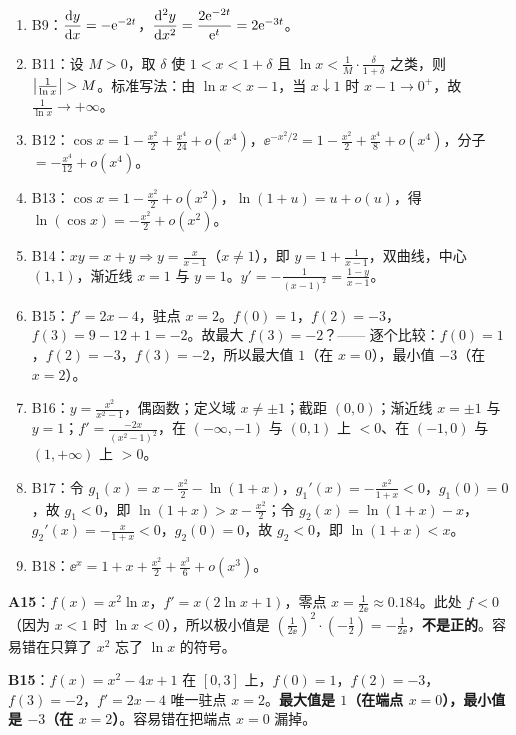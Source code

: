 \begin{methodbox}[B 卷关键步骤]
\begin{enumerate}
\item B9：$\dfrac{\mathrm{d} y}{\mathrm{d} x}=-\mathrm{e}^{-2t}$，$\dfrac{\mathrm{d}^{2}y}{\mathrm{d} x^{2}}=\dfrac{2\mathrm{e}^{-2t}}{\mathrm{e}^{t}}=2\mathrm{e}^{-3t}$。
\item B11：设 $M>0$，取 $\delta$ 使 $1<x<1+\delta$ 且 $\ln x<\frac{1}{M}\cdot\frac{\delta}{1+\delta}$ 之类，则 $\left\lvert \frac1{\ln x}\right\rvert>M$。标准写法：由 $\ln x< x-1$，当 $x\downarrow1$ 时 $x-1\to0^{+}$，故 $\frac{1}{\ln x}\to+\infty$。
\item B12：$\cos x=1-\frac{x^{2}}2+\frac{x^{4}}{24}+o(x^{4})$，$\ee^{-x^{2}/2}=1-\frac{x^{2}}2+\frac{x^{4}}8+o(x^{4})$，分子 $=-\frac{x^{4}}{12}+o(x^{4})$。
\item B13：$\cos x=1-\frac{x^{2}}2+o(x^{2})$，$\ln(1+u)=u+o(u)$，得 $\ln(\cos x)=-\frac{x^{2}}2+o(x^{2})$。
\item B14：$xy=x+y\Rightarrow y=\frac{x}{x-1}$（$x\neq1$），即 $y=1+\frac{1}{x-1}$，双曲线，中心 $(1,1)$，渐近线 $x=1$ 与 $y=1$。$y'=-\frac{1}{(x-1)^{2}}=\frac{1-y}{x-1}$。
\item B15：$f'=2x-4$，驻点 $x=2$。$f(0)=1$，$f(2)=-3$，$f(3)=9-12+1=-2$。故最大 $f(3)=-2$？—— 逐个比较：$f(0)=1$，$f(2)=-3$，$f(3)=-2$，所以最大值 $1$（在 $x=0$），最小值 $-3$（在 $x=2$）。
\item B16：$y=\frac{x^{2}}{x^{2}-1}$，偶函数；定义域 $x\neq\pm1$；截距 $(0,0)$；渐近线 $x=\pm1$ 与 $y=1$；$f'=\frac{-2x}{(x^{2}-1)^{2}}$，在 $(-\infty,-1)$ 与 $(0,1)$ 上 $<0$、在 $(-1,0)$ 与 $(1,+\infty)$ 上 $>0$。
\item B17：令 $g_1(x)=x-\frac{x^{2}}2-\ln(1+x)$，$g_1'(x)=-\frac{x^{2}}{1+x}<0$，$g_1(0)=0$，故 $g_1<0$，即 $\ln(1+x)>x-\frac{x^{2}}2$；令 $g_2(x)=\ln(1+x)-x$，$g_2'(x)=-\frac{x}{1+x}<0$，$g_2(0)=0$，故 $g_2<0$，即 $\ln(1+x)<x$。
\item B18：$\ee^{x}=1+x+\frac{x^{2}}2+\frac{x^{3}}6+o(x^{3})$。
\end{enumerate}
\end{methodbox}

\begin{warnbox}
\textbf{A15}：$f(x)=x^{2}\ln x$，$f'=x(2\ln x+1)$，零点 $x=\frac{1}{2\ee}\approx0.184$。此处 \textbf{$f<0$}（因为 $x<1$ 时 $\ln x<0$），所以极小值是 $\left(\frac{1}{2\ee}\right)^{2}\cdot\left(-\frac12\right)=-\frac{1}{2\ee}$，\textbf{不是正的}。容易错在只算了 $x^{2}$ 忘了 $\ln x$ 的符号。

\textbf{B15}：$f(x)=x^{2}-4x+1$ 在 $[0,3]$ 上，$f(0)=1$，$f(2)=-3$，$f(3)=-2$，$f'=2x-4$ 唯一驻点 $x=2$。\textbf{最大值是 $1$（在端点 $x=0$），最小值是 $-3$（在 $x=2$）}。容易错在把端点 $x=0$ 漏掉。
\end{warnbox}

